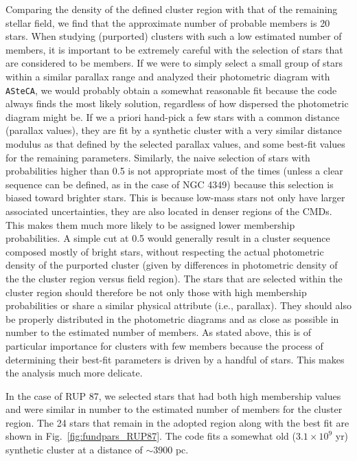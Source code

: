 \documentclass[draft]{aa}
\begin{document}
Comparing the density of the defined cluster region with that of the
remaining stellar field, we find that the approximate number of probable
members is 20 stars.
%
When studying (purported) clusters with such a low estimated number of
members, it is important to be extremely careful with the selection of stars
that are considered to be members. If we were to simply select a small group
of stars within a similar parallax range and analyzed their photometric
diagram with \texttt{ASteCA}, we would probably obtain a somewhat reasonable
fit because the code always finds the most likely solution,
regardless of how dispersed the photometric diagram might be. If we a
priori hand-pick a few stars with a common distance (parallax values), they
are fit by a synthetic cluster with a very similar distance modulus as
that defined by the selected parallax values, and some best-fit values
for the remaining parameters.
%
Similarly, the naive selection of stars with probabilities higher than 0.5 is
not appropriate most of the times (unless a clear sequence can
be defined, as in the case of NGC 4349) because this selection is biased
toward brighter stars.
This is because low-mass stars not only have larger associated uncertainties,
they are also located in denser regions of the CMDs. This makes them much more
likely to be assigned lower membership probabilities. A simple cut at 0.5
would generally result in a cluster sequence composed mostly of bright stars,
without respecting the actual photometric density of the purported cluster 
(given by differences in photometric density of the the cluster region versus field region).
%
The stars that are selected within the cluster region should therefore be not only those
with high membership probabilities or share a similar physical attribute 
(i.e., parallax). They should also be properly distributed in the photometric
diagrams and as close as possible in number to the estimated number of members.
As stated above, this is of particular importance for clusters with few members because the process of determining their best-fit parameters is driven by a handful of
stars. This makes the analysis much more delicate.

In the case of RUP 87, we selected stars that had both high membership
values and were similar in number to the estimated number of members for the
cluster region. The 24 stars that remain in the adopted region along with the
best fit are shown in Fig.~\ref{fig:fundpars_RUP87}. The code fits a
somewhat old ($3.1\times10^9$ yr) synthetic cluster at a distance of
$\sim3900$ pc.\\
\end{document}
